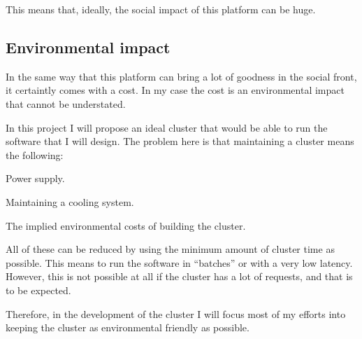 This means that, ideally, the social impact of this platform can be huge.

\subsection{Environmental impact}

In the same way that this platform can bring a lot of goodness in the social
front, it certaintly comes with a cost. In my case the cost is an environmental
impact that cannot be understated.

In this project I will propose an ideal cluster that would be able to run the
software that I will design. The problem here is that maintaining a cluster
means the following:

\mylist
  \item Power supply.
  \item Maintaining a cooling system.
  \item The implied environmental costs of building the cluster.
\mylistend

All of these can be reduced by using the minimum amount of cluster time as
possible. This means to run the software in ``batches'' or with a very low
latency. However, this is not possible at all if the cluster has a lot of
requests, and that is to be expected.

Therefore, in the development of the cluster I will focus most of my efforts
into keeping the cluster as environmental friendly as possible.
